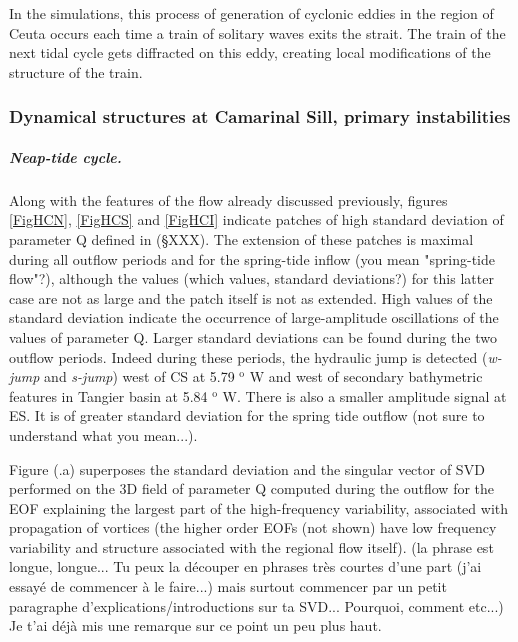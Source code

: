 In the simulations, this process of generation of cyclonic eddies \color{blue} in the region of Ceuta \color{black} occurs each time a train of solitary waves exits the strait. The train of the next tidal cycle gets diffracted on this eddy, creating local \color{blue}modifications of the structure of the train. \color{black}

\subsubsection{Dynamical structures at Camarinal Sill, primary instabilities}
\label{sectionsim3D_res_insta}

\subparagraph{Neap-tide cycle.}
Along with the features of the flow already discussed previously, figures \ref{FigHCN}, \ref{FigHCS} and \ref{FigHCI} indicate patches of high standard deviation of parameter Q \color{blue} defined in (\S XXX). The extension of these patches is maximal during all outflow periods \color{black} and for the spring-tide inflow \color{green} (you mean "spring-tide flow"?), \color{black} although the values \color{green}(which values, standard deviations?) \color{black} for this latter case are not as large and the patch itself is not as extended. High values of the \color{blue} standard deviation \color{black} indicate the occurrence of large-amplitude oscillations of the values of parameter Q. \color{blue} Larger standard deviations can be found during the two outflow periods. Indeed during these periods, the hydraulic jump \color{black} is detected (\textit{w-jump} and \textit{s-jump}) west of CS at 5.79 $^\text{o}$ W and west of secondary bathymetric features in Tangier basin at 5.84 $^\text{o}$ W. There is also \color{blue} a smaller amplitude \color{black} signal at ES. It is of greater standard deviation for the spring tide outflow \color{green} (not sure to understand what you mean...). \color{black}

\color{blue}Figure (.a) superposes the standard deviation and \color{black} the singular vector of SVD performed on the 3D field of parameter Q computed during the outflow for the EOF explaining the largest part of the high-frequency variability, associated with propagation of vortices (the higher order EOFs (not shown) have low frequency variability and structure associated with the regional flow itself). \color{green}(la phrase est longue, longue... Tu peux la découper en phrases très courtes d'une part (j'ai essayé de commencer à le faire...) mais surtout commencer par un petit paragraphe d'explications/introductions sur ta SVD... Pourquoi, comment etc...) Je t'ai déjà mis une remarque sur ce point un peu plus haut. \color{black}

